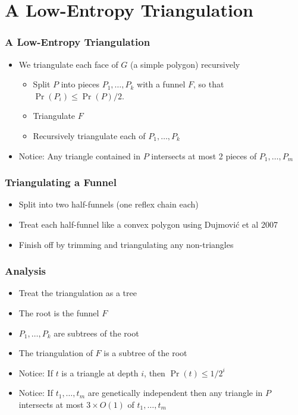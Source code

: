 \documentclass{beamer}
\begin{document}
\section{A Low-Entropy Triangulation}
\frame
{
   \frametitle{A Low-Entropy Triangulation}

   \begin{itemize}
     \item<1->We triangulate each face of $G$ (a simple polygon)
         recursively
     \begin{center}
     \end{center}
     \begin{itemize}
     \item<2->Split $P$ into pieces $P_1,\ldots,P_k$ with a funnel $F$, so
that $\Pr(P_i) \le \Pr(P)/2$. 
     \item<3->Triangulate $F$
     \item<4->Recursively triangulate each of $P_1,\ldots,P_k$
     \end{itemize}
     \item<5->Notice: Any triangle contained in $P$ intersects at most 2 pieces of $P_1,\ldots,P_m$
   \end{itemize}
}



\frame
{
   \frametitle{Triangulating a Funnel}
   \begin{center} 
   \end{center}
   \begin{itemize}
     \item<2->Split into two half-funnels (one reflex chain each)
     \item<3->Treat each half-funnel like a convex polygon using Dujmovi\'c et al 2007
     \item<4->Finish off by trimming and triangulating any non-triangles
   \end{itemize}
}

\frame
{
  \frametitle{Analysis}
  \begin{itemize}
    \item<1-> Treat the triangulation as a tree
      \item<2-> The root is the funnel $F$
      \item<3-> $P_1,\ldots,P_k$ are subtrees of the root
      \item<4-> The triangulation of $F$ is a subtree of the root
      \item<5-> Notice: If $t$ is a triangle at depth $i$, then $\Pr(t)\le
1/2^i$
      \item<6-> Notice: If $t_1,\ldots,t_m$ are genetically
independent then any triangle in $P$ intersects at most $3\times O(1)$ of
$t_1,\ldots,t_m$ 
  \end{itemize}
}
\end{document}
